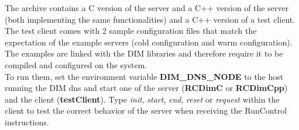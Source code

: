 \documentclass[a4paper]{article}
\begin{document}
The archive contains a C version of the server and a C++ version of the server (both implementing
the same functionalities) and a C++ version of a test client.
The test client comes with 2 sample configuration files that match the expectation of the
example servers (cold configuration and warm configuration).\\
The examples are linked with the DIM libraries and therefore require it to be compiled and
configured on the system.\\
To run them, set the environment variable \textbf{DIM\_DNS\_NODE} to the host running the DIM dns
and start one of the server (\textbf{RCDimC} or \textbf{RCDimCpp}) and the client (\textbf{testClient}). Type
\textit{init}, \textit{start}, \textit{end}, \textit{reset} or \textit{request} within the client to test the
correct behavior of the server when receiving the RunControl instructions.

\thebibliography{}

\end{document}
